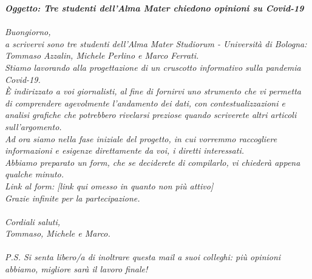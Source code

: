 \textit{\textbf{Oggetto: Tre studenti dell'Alma Mater chiedono opinioni su Covid-19}}\\ \\
\textit{Buongiorno,}\\
\textit{a scrivervi sono tre studenti dell'Alma Mater Studiorum - Università di Bologna: Tommaso Azzalin, Michele Perlino e Marco Ferrati.}\\
\textit{Stiamo lavorando alla progettazione di un cruscotto informativo sulla pandemia Covid-19.}\\
\textit{È indirizzato a voi giornalisti, al fine di fornirvi uno strumento che vi permetta di comprendere agevolmente l'andamento dei dati, con contestualizzazioni e analisi grafiche che potrebbero rivelarsi preziose quando scriverete altri articoli sull'argomento.}\\
\textit{Ad ora siamo nella fase iniziale del progetto, in cui vorremmo raccogliere informazioni e esigenze direttamente da voi, i diretti interessati.}\\
\textit{Abbiamo preparato un form, che se deciderete di compilarlo, vi chiederà appena qualche minuto.}\\
\textit{Link al form: [link qui omesso in quanto non più attivo]}\\
\textit{Grazie infinite per la partecipazione.}\\ \\
\textit{Cordiali saluti,}\\
\textit{Tommaso, Michele e Marco.}\\ \\
\textit{P.S. Si senta libero/a di inoltrare questa mail a suoi colleghi: più opinioni abbiamo, migliore sarà il lavoro finale!}\\ \\